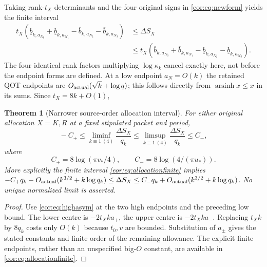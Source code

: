 \documentclass[11pt,a4paper]{article}
\newtheorem{theorem}{Theorem}[section]
\DeclareMathOperator{\arsinh}{arsinh}
\begin{document}
Taking rank-$t_X$ determinants and the four original signs in
\eqref{eor:eq:newform} yields the finite interval
\begin{equation}
\begin{split}
 t_X(\underline b_{k,a_{N_0}}+\underline b_{k,a_{N_1}}
     -\overline b_{k,a_{N_2}}-\overline b_{k,a_{N_3}})
 &\le\Delta S_X\\
 &\le
 t_X(\overline b_{k,a_{N_0}}+\overline b_{k,a_{N_1}}
     -\underline b_{k,a_{N_2}}-\underline b_{k,a_{N_3}}).
\end{split}\label{eor:eq:allocationfinite}
\end{equation}
The four identical rank factors multiplying $\log\kappa_k$ cancel exactly here,
not before the endpoint forms are defined.
At a low endpoint $a_N=O(k)$ the retained QOT endpoints are
$O_{\rm actual}(\sqrt k+\log q)$; this follows directly from
$\arsinh x\le x$ in its sums. Since $t_X=8k+O(1)$,
\begin{theorem}[Narrower source-order allocation interval]
For either original allocation $X=K,R$ at a fixed stipulated packet and period,
\begin{equation}
 \boxed{\quad
 -C_+\le\liminf_{k\equiv1\ (4)}\frac{\Delta S_X}{q_k}
 \le\limsup_{k\equiv1\ (4)}\frac{\Delta S_X}{q_k}\le C_-,
 \quad}\label{eor:eq:alloclimit}
\end{equation}
where
\begin{equation}
 C_+=8\log(\pi v_*/4),\qquad
 C_-=8\log(4/(\pi u_*)).
 \label{eor:eq:Cpm}
\end{equation}
More explicitly the finite interval \eqref{eor:eq:allocationfinite} implies
$-C_+q_k-O_{\rm actual}(k^{3/2}+k\log q_k)\le\Delta S_X
\le C_-q_k+O_{\rm actual}(k^{3/2}+k\log q_k)$.
No unique normalized limit is asserted.
\end{theorem}
\begin{proof}
Use \eqref{eor:eq:highasym} at the two high endpoints and the preceding low bound.
The lower centre is $-2t_Xka_+$, the upper centre is $-2t_Xka_-$.
Replacing $t_Xk$ by $8q_k$ costs only $O(k)$ because $t_0,v$ are bounded.
Substitution of $a_\pm$ gives the stated constants and finite order of the
remaining allowance. The explicit finite endpoints, rather than an unspecified
big-$O$ constant, are available in \eqref{eor:eq:allocationfinite}.
\end{proof}
\end{document}
